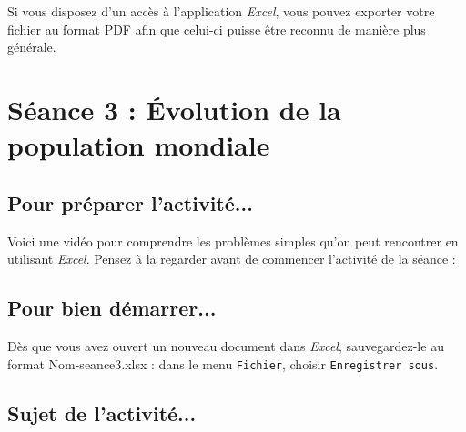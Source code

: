 Si vous disposez d'un accès à l'application \emph{Excel}, vous pouvez exporter votre fichier au format PDF afin que celui-ci puisse être reconnu de manière plus générale.

\newpage



%
%
%
%




\section{Séance 3 : Évolution de la population mondiale}\label{ficheTableur3}

\subsection{Pour préparer l'activité...}

Voici une vidéo pour comprendre les problèmes simples qu'on peut rencontrer en utilisant \emph{Excel}. Pensez à la regarder avant de commencer l'activité de la séance :

\begin{center}
\end{center}

\subsection{Pour bien démarrer...}

Dès que vous avez ouvert un nouveau document dans \emph{Excel}, sauvegardez-le au format Nom-seance3.xlsx : dans le menu \texttt{Fichier}, choisir \texttt{Enregistrer sous}. 


\subsection{Sujet de l'activité...}

